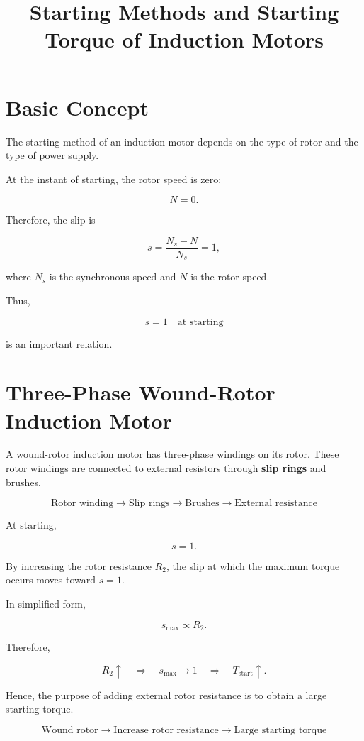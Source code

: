 \documentclass[a4paper,11pt]{article}
\title{Starting Methods and Starting Torque of Induction Motors}
\author{}
\date{}
\begin{document}
\maketitle

\section{Basic Concept}

The starting method of an induction motor depends on the type of rotor
and the type of power supply.

At the instant of starting, the rotor speed is zero:

\[
N = 0.
\]

Therefore, the slip is

\[
s = \frac{N_s-N}{N_s} = 1,
\]

where \(N_s\) is the synchronous speed and \(N\) is the rotor speed.

Thus,

\[
\boxed{s=1 \quad \text{at starting}}
\]

is an important relation.

\section{Three-Phase Wound-Rotor Induction Motor}

A wound-rotor induction motor has three-phase windings on its rotor.
These rotor windings are connected to external resistors through
\textbf{slip rings} and brushes.

\[
\boxed{
\text{Rotor winding}
\rightarrow
\text{Slip rings}
\rightarrow
\text{Brushes}
\rightarrow
\text{External resistance}
}
\]

At starting,

\[
s=1.
\]

By increasing the rotor resistance \(R_2\), the slip at which the
maximum torque occurs moves toward \(s=1\).

In simplified form,

\[
s_{\mathrm{max}} \propto R_2.
\]

Therefore,

\[
R_2 \uparrow
\quad\Rightarrow\quad
s_{\mathrm{max}} \rightarrow 1
\quad\Rightarrow\quad
T_{\mathrm{start}} \uparrow.
\]

Hence, the purpose of adding external rotor resistance is to obtain
a large starting torque.

\[
\boxed{
\text{Wound rotor}
\rightarrow
\text{Increase rotor resistance}
\rightarrow
\text{Large starting torque}
}
\]
\end{document}

